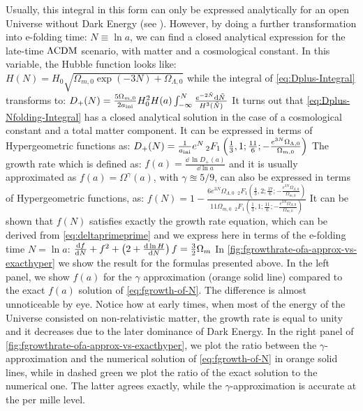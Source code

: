 Usually, this integral in this form can only be expressed analytically for
an open Universe without Dark Energy (see ).
However, by doing a further transformation into e-folding time: $ N \equiv \ln a$,
we can find a closed analytical expression
for the late-time $\Lambda\mathrm{CDM}$ scenario, with matter and a cosmological constant.
In this variable, the Hubble function looks like:
\beeqc$
H(N) = H_0 \sqrt{\Omega_{m,0} \exp{(-3 N)} + \Omega_{\Lambda,0} }
$
while the integral of \cref{eq:Dplus-Integral} transforms to:
\beeqp$\label{eq:Dplus-Nfolding-Integral}
D_{+}(N)  = \frac{5 \Omega_{m,0}}{2 a_{\rm ini}} H_0^2 H(a) \int_{-\infty}^{N} 
\frac{e^{-2 \tilde N} \mathrm{d} {\tilde{N}} \,}{ H^3(\tilde N)}
$
It turns out that \cref{eq:Dplus-Nfolding-Integral} has a closed analytical
solution in the case of a cosmological constant and a total matter component.
It can be expressed in terms of Hypergeometric functions as:
\beeqp$\label{eq:Dplus-Hyper}
D_{+}(N) = \frac{1}{a_{\rm ini}} e^{N} \, _2F_1\left(\frac{1}{3},1;\frac{11}{6};-\frac{e^{3 N} \Omega_{\Lambda,0}}{ \Omega_{m,0} } \right)
$
The growth rate which is defined as:
\beeqc$
f(a) = \frac{\dd{\,\ln} D_{+}(a)}{\dd \ln a} 
$
and it is usually approximated as $f(a)=\Omega^\gamma (a)$,
with $\gamma \approxeq 5/9$, 
can also be expressed in terms of Hypergeometric functions, as:
\beeqp$\label{eq:fgrowth-of-N}
f(N) = 1-\frac{6 e^{3 N} \Omega _{\Lambda ,0} \,\; _2F_1\left(\frac{4}{3},2;\frac{17}{6};-\frac{e^{3 N} \Omega _{\Lambda ,0}}{\Omega _{m,0}}\right)}{11 \Omega _{m,0} \;\, _2F_1\left(\frac{1}{3},1;\frac{11}{6};-\frac{e^{3 N} \Omega_{\Lambda ,0}}{\Omega _{m,0}}\right)}
$
It can be shown that $f(N)$ satisfies exactly the growth rate equation, which can be derived
from \cref{eq:deltaprimeprime} and we express here in terms of the e-folding time
$N = \ln a$:
\beeqp$\label{eq:f-of-N-diffeq}
 \frac{\mathrm{d} {f} }{\mathrm{d} {N}} + f^2 + \left( 2 + \frac{\mathrm{d} {\,\ln H} }{\mathrm{d} {N}} \right) f = \frac{3}{2} \Omega_m
$
In \cref{fig:fgrowthrate-ofa-approx-vs-exacthyper} we show the result
for the formulas presented above. In the left panel,
we show $f(a)$ for the $\gamma$ approximation (orange solid line) compared
to the exact $f(a)$ solution of \cref{eq:fgrowth-of-N}. The difference is almost unnoticeable
by eye. Notice how at early times, when most of the energy of the Universe
consisted on non-relativistic matter, the growth rate is equal to unity and it 
decreases due to the later dominance of Dark Energy.
In the right panel of \cref{fig:fgrowthrate-ofa-approx-vs-exacthyper},
we plot the ratio between the $\gamma$-approximation and the numerical solution
of \cref{eq:fgrowth-of-N} in orange solid lines,
while in dashed green we plot the ratio of the exact solution to the numerical one.
The latter agrees exactly, while the $\gamma$-approximation is accurate at the per mille level.

